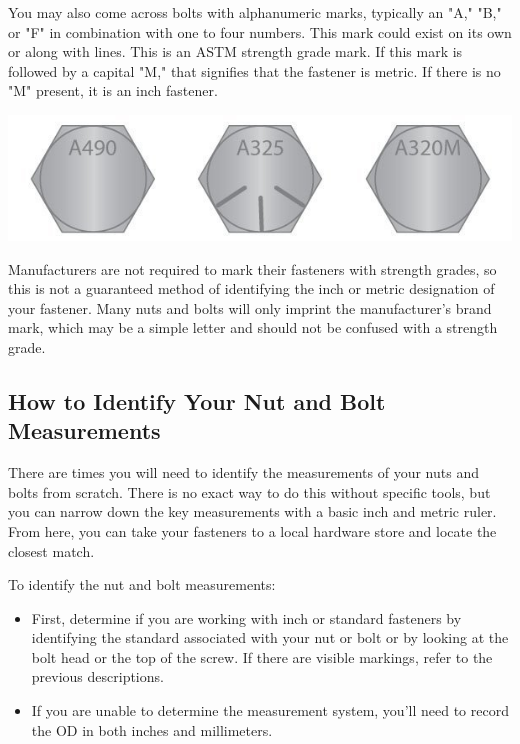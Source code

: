 \documentclass[12pt, a4paper]{article}
\providecommand{\tightlist}{%
	\setlength{\itemsep}{0pt}\setlength{\parskip}{0pt}}
\providecommand{\tightlist}{%
	\setlength{\itemsep}{0pt}\setlength{\parskip}{0pt}}
\begin{document}
		\hypertarget{ibwq7f}{}
		You may also come across bolts with alphanumeric marks, typically an
		"A," "B," or "F" in combination with one to four numbers. This mark
		could exist on its own or along with lines. This is an ASTM strength
		grade mark. If this mark is followed by a capital "M," that signifies
		that the fastener is metric. If there is no "M" present, it is an inch
		fastener.
		
		\hypertarget{ioka1w}{}
		\includegraphics{Introduction to Nut and Bolt Sizes_files/6307b985e0134715291439.jpg}
		
		\hypertarget{i2x1zy}{}
		
		\hypertarget{ite14y}{}
		Manufacturers are not required to mark their fasteners with strength
		grades, so this is not a guaranteed method of identifying the inch or
		metric designation of your fastener. Many nuts and bolts will only
		imprint the manufacturer's brand mark, which may be a simple letter and
		should not be confused with a strength grade.
		
		\hypertarget{i72lz7}{%
			\subsection{How to Identify Your Nut and Bolt
				Measurements}\label{i72lz7}}
		
		\hypertarget{iw4hn7}{}
		There are times you will need to identify the measurements of your nuts
		and bolts from scratch. There is no exact way to do this without
		specific tools, but you can narrow down the key measurements with a
		basic inch and metric ruler. From here, you can take your fasteners to a
		local hardware store and locate the closest match.
		
		\hypertarget{ilxb3s}{}
		To identify the nut and bolt measurements:
		
		\begin{itemize}
			\tightlist
			\item
			First, determine if you are working with inch or standard fasteners by
			identifying the standard associated with your nut or bolt or by
			looking at the bolt head or the top of the screw. If there are visible
			markings, refer to the previous descriptions.
			\item
			If you are unable to determine the measurement system, you'll need to
			record the OD in both inches and millimeters.
		\end{itemize}
		
\end{document}
